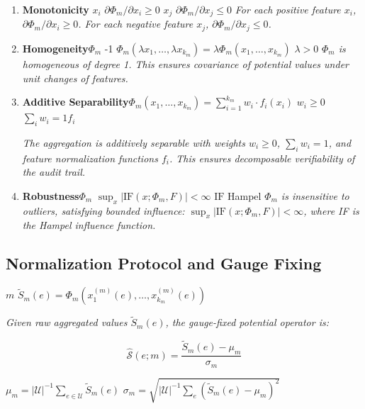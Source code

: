 \documentclass[11pt,a4paper]{article}
\theoremstyle{definition}
\newcommand{\Sop}{\hat{\mathcal{S}}}
\newcommand{\universe}{\mathcal{U}}
\begin{document}
\begin{enumerate}[leftmargin=*,label=\textbf{DP\arabic*:}]
    \item \textbf{ Monotonicity} $x_i$
    $\partial \Phi_m / \partial x_i \geq 0$ $x_j$
    $\partial \Phi_m / \partial x_j \leq 0$
    \textit{For each positive feature $x_i$, $\partial \Phi_m / \partial x_i \geq 0$. For each negative feature $x_j$, $\partial \Phi_m / \partial x_j \leq 0$.}
    
    \item \textbf{ Homogeneity}$\Phi_m$ -1
    $\Phi_m(\lambda x_1, \ldots, \lambda x_{k_m}) = \lambda \Phi_m(x_1, \ldots, x_{k_m})$
     $\lambda > 0$
    \textit{$\Phi_m$ is homogeneous of degree 1. This ensures covariance of potential values under unit changes of features.}
    
    \item \textbf{ Additive Separability}$\Phi_m(x_1, \ldots, x_{k_m}) = \sum_{i=1}^{k_m} w_i \cdot f_i(x_i)$
     $w_i \geq 0$  $\sum_i w_i = 1$$f_i$ 
    
    \textit{The aggregation is additively separable with weights $w_i \geq 0$, $\sum_i w_i = 1$, and feature normalization functions $f_i$. This ensures decomposable verifiability of the audit trail.}
    
    \item \textbf{ Robustness}$\Phi_m$ 
    $\sup_{x} |\text{IF}(x; \Phi_m, F)| < \infty$ $\text{IF}$ Hampel
    \textit{$\Phi_m$ is insensitive to outliers, satisfying bounded influence: $\sup_{x} |\text{IF}(x; \Phi_m, F)| < \infty$, where IF is the Hampel influence function.}
\end{enumerate}

\subsection{ Normalization Protocol and Gauge Fixing}

 $m$  $\tilde{S}_m(e) = \Phi_m(x_1^{(m)}(e), \ldots, x_{k_m}^{(m)}(e))$


\medskip
\noindent\textit{Given raw aggregated values $\tilde{S}_m(e)$, the gauge-fixed potential operator is:}

\begin{equation}
    \Sop(e; m) = \frac{\tilde{S}_m(e) - \mu_m}{\sigma_m}
    \label{eq:z-normalize}
\end{equation}

 $\mu_m = |\universe|^{-1} \sum_{e \in \universe} \tilde{S}_m(e)$ 
$\sigma_m = \sqrt{|\universe|^{-1} \sum_{e} (\tilde{S}_m(e) - \mu_m)^2}$ 
\end{document}
